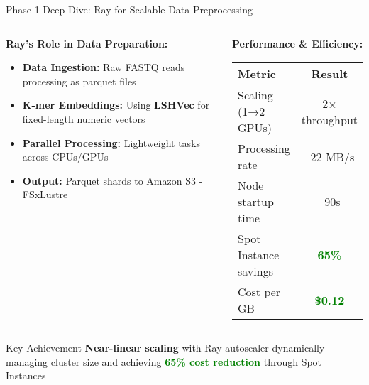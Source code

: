 \documentclass[aspectratio=169]{beamer}
\begin{document}
\begin{frame}{Phase 1 Deep Dive: Ray for Scalable Data Preprocessing}
    \begin{columns}
        \begin{column}{0.5\textwidth}
            \textbf{Ray's Role in Data Preparation:}
            \begin{itemize}
                \item \textbf{Data Ingestion:} Raw FASTQ reads processing as parquet files
                \item \textbf{K-mer Embeddings:} Using \textcolor{rayblue}{\textbf{LSHVec}} for fixed-length numeric vectors
                \item \textbf{Parallel Processing:} Lightweight tasks across CPUs/GPUs
                \item \textbf{Output:} Parquet shards to Amazon S3 - FSxLustre
            \end{itemize}
        \end{column}
        \begin{column}{0.5\textwidth}
            \textbf{Performance \& Efficiency:}
            \begin{table}[h]
                \centering
                \small
                \begin{tabular}{lc}
                    \toprule
                    \textbf{Metric} & \textbf{Result} \\
                    \midrule
                    Scaling (1→2 GPUs) & 2× throughput \\
                    Processing rate & ~22 MB/s \\
                    Node startup time & ~90s \\
                    Spot Instance savings & \textcolor{green}{\textbf{65\%}} \\
                    Cost per GB & \textcolor{green}{\textbf{\$0.12}} \\
                    \bottomrule
                \end{tabular}
            \end{table}
        \end{column}
    \end{columns}
    
    \vspace{0.3cm}
    \begin{block}{Key Achievement}
        \textbf{Near-linear scaling} with Ray autoscaler dynamically managing cluster size and achieving \textcolor{green}{\textbf{65\% cost reduction}} through Spot Instances
    \end{block}
\end{frame}
\end{document}
